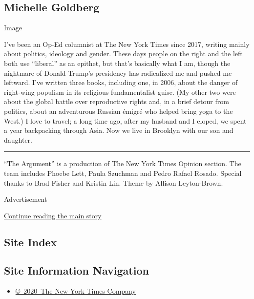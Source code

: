 \hypertarget{michelle-goldberg}{%
\subsection{Michelle Goldberg}\label{michelle-goldberg}}

Image

I've been an Op-Ed columnist at The New York Times since 2017, writing
mainly about politics, ideology and gender. These days people on the
right and the left both use ``liberal'' as an epithet, but that's
basically what I am, though the nightmare of Donald Trump's presidency
has radicalized me and pushed me leftward. I've written three books,
including one, in 2006, about the danger of right-wing populism in its
religious fundamentalist guise. (My other two were about the global
battle over reproductive rights and, in a brief detour from politics,
about an adventurous Russian émigré who helped bring yoga to the West.)
I love to travel; a long time ago, after my husband and I eloped, we
spent a year backpacking through Asia. Now we live in Brooklyn with our
son and daughter.

\begin{center}\rule{0.5\linewidth}{\linethickness}\end{center}

``The Argument'' is a production of The New York Times Opinion section.
The team includes Phoebe Lett, Paula Szuchman and Pedro Rafael Rosado.
Special thanks to Brad Fisher and Kristin Lin. Theme by Allison
Leyton-Brown.

Advertisement

\protect\hyperlink{after-bottom}{Continue reading the main story}

\hypertarget{site-index}{%
\subsection{Site Index}\label{site-index}}

\hypertarget{site-information-navigation}{%
\subsection{Site Information
Navigation}\label{site-information-navigation}}

\begin{itemize}
\tightlist
\item
  \href{https://help.nytimes.com/hc/en-us/articles/115014792127-Copyright-notice}{©~2020~The
  New York Times Company}
\end{itemize}

